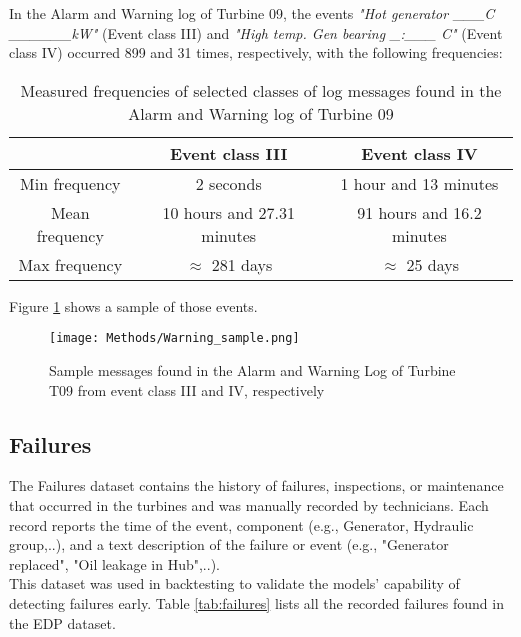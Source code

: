   In the Alarm and Warning log of Turbine 09, the events \emph{"Hot generator \_\_\_\degree C \_\_\_\_\_\_kW"} (Event class III) and 
  \emph{"High temp. Gen bearing \_:\_\_\_ \degree C"} (Event class IV) occurred 899 and 31 times, respectively, with the following frequencies:
  \begin{table}[h]
    \centering
    \begin{tabular}{cc|c|}
      \cline{2-3}
      \multicolumn{1}{c|}{} & \textbf{Event class III} & \textbf{Event class IV} \\
      \hline
      \multicolumn{1}{|c|}{Min frequency} & 2 seconds & 1 hour and 13 minutes \\
      \hline
      \multicolumn{1}{|c|}{Mean frequency} & 10 hours and 27.31 minutes & 91 hours and 16.2 minutes \\
      \hline
      \multicolumn{1}{|c|}{Max frequency} & $\approx$ 281 days & $\approx$ 25 days \\
      \hline
    \end{tabular}
    \caption{Measured frequencies of selected classes of log messages found in the Alarm and Warning log of Turbine 09}
    \label{tab:AlrmWarnLogsT09}
  \end{table}

  \begin{flushleft}
  Figure \ref{fig:sample_warnings} shows a sample of those events.
  \end{flushleft}

  \begin{figure}[h]
    \begin{center}
      \texttt{[image: Methods/Warning\_sample.png]}
    \end{center}
    \caption{Sample messages found in the Alarm and Warning Log of Turbine T09 from event class III and IV, respectively}
    \label{fig:sample_warnings}
  \end{figure}



\subsection{Failures}
  The Failures dataset contains the history of failures, inspections, or maintenance that occurred in the turbines and was manually recorded by technicians. 
  Each record reports the time of the event, component (e.g., Generator, Hydraulic group,..), and a text description of the failure 
  or event (e.g., "Generator replaced", "Oil leakage in Hub",..).\\ 
  This dataset was used in backtesting to validate the models' capability of detecting failures early. Table \ref{tab:failures} lists all the recorded failures found 
  in the EDP dataset.

